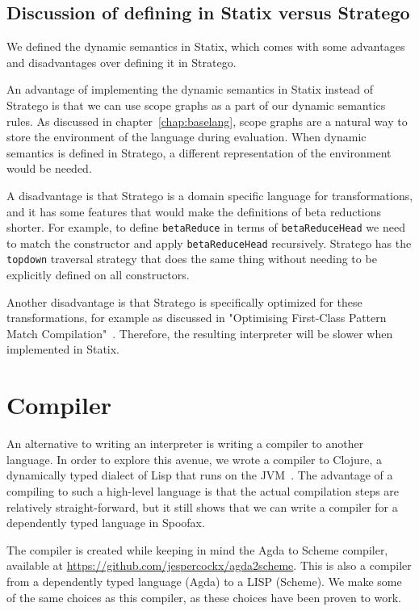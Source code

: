 \subsection{Discussion of defining in Statix versus Stratego}

We defined the dynamic semantics in Statix, which comes with some advantages and disadvantages over defining it in Stratego. 

An advantage of implementing the dynamic semantics in Statix instead of Stratego is that we can use scope graphs as a part of our dynamic semantics rules. As discussed in chapter~\ref{chap:baselang}, scope graphs are a natural way to store the environment of the language during evaluation. When dynamic semantics is defined in Stratego, a different representation of the environment would be needed.

A disadvantage is that Stratego is a domain specific language for transformations, and it has some features that would make the definitions of beta reductions shorter. For example, to define \verb|betaReduce| in terms of \verb|betaReduceHead| we need to match the constructor and apply \verb|betaReduceHead| recursively. Stratego has the \verb|topdown| traversal strategy that does the same thing without needing to be explicitly defined on all constructors.

Another disadvantage is that Stratego is specifically optimized for these transformations, for example as discussed in "Optimising First-Class Pattern Match Compilation"~\cite{fcpmc}. Therefore, the resulting interpreter will be slower when implemented in Statix.

\section{Compiler}
An alternative to writing an interpreter is writing a compiler to another language. In order to explore this avenue, we wrote a compiler to Clojure, a dynamically typed dialect of Lisp that runs on the JVM~\cite{clojure}. The advantage of a compiling to such a high-level language is that the actual compilation steps are relatively straight-forward, but it still shows that we can write a compiler for a dependently typed language in Spoofax.

The compiler is created while keeping in mind the Agda to Scheme compiler, available at \url{https://github.com/jespercockx/agda2scheme}. This is also a compiler from a dependently typed language (Agda) to a LISP (Scheme). We make some of the same choices as this compiler, as these choices have been proven to work.

